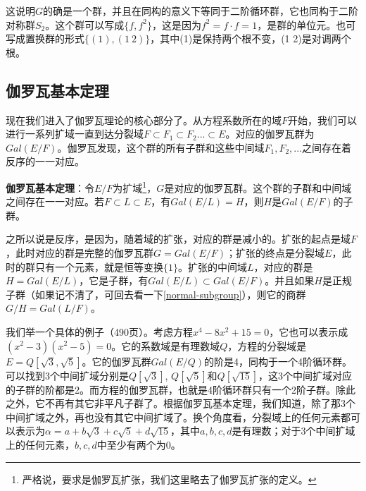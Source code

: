 \documentclass{article}
\begin{document}
这说明$G$的确是一个群，并且在同构的意义下等同于二阶循环群，它也同构于二阶对称群$S_2$。这个群可以写成$\{f, f^2\}$，这是因为$f^2 = f \cdot f = 1$，是群的单位元。也可写成置换群的形式$\{(1), (1\ 2)\}$，其中(1)是保持两个根不变，(1 2)是对调两个根。

\begin{Exercise}
\end{Exercise}

\subsection{伽罗瓦基本定理}

现在我们进入了伽罗瓦理论的核心部分了。从方程系数所在的域$F$开始，我们可以进行一系列扩域一直到达分裂域$F \subset F_1 \subset F_2 ... \subset E$。对应的伽罗瓦群为$Gal(E/F)$。伽罗瓦发现，这个群的所有子群和这些中间域$F_1, F_2, ...$之间存在着反序的一一对应。

\begin{theorem}
\textbf{伽罗瓦基本定理}：令$E/F$为扩域\footnote{严格说，要求是伽罗瓦扩张，我们这里略去了伽罗瓦扩张的定义。}，$G$是对应的伽罗瓦群。这个群的子群和中间域之间存在一一对应。若$F \subset L \subset E$，有$Gal(E/L) = H$，则$H$是$Gal(E/F)$的子群。
\end{theorem}

之所以说是反序，是因为，随着域的扩张，对应的群是减小的。扩张的起点是域$F$，此时对应的群是完整的伽罗瓦群$G = Gal(E/F)$；扩张的终点是分裂域$E$，此时的群只有一个元素，就是恒等变换$\{1\}$。扩张的中间域$L$，对应的群是$H = Gal(E/L)$，它是子群，有$Gal(E/L) \subset Gal(E/F)$。并且如果$H$是正规子群（如果记不清了，可回去看一下\ref{normal-subgroup}），则它的商群$G/H = Gal(L/F)$。

我们举一个具体的例子\cite{MArtin}（490页）。考虑方程$x^4 - 8x^2 + 15 = 0$，它也可以表示成$(x^2 - 3)(x^2 - 5) = 0$。它的系数域是有理数域$Q$，方程的分裂域是$E = Q[\sqrt{3}, \sqrt{5}]$。它的伽罗瓦群$Gal(E/Q)$的阶是4，同构于一个4阶循环群。可以找到3个中间扩域分别是$Q[\sqrt{3}]$, $Q[\sqrt{5}]$和$Q[\sqrt{15}]$，这3个中间扩域对应的子群的阶都是2。而方程的伽罗瓦群，也就是4阶循环群只有一个2阶子群。除此之外，它不再有其它非平凡子群了。根据伽罗瓦基本定理，我们知道，除了那3个中间扩域之外，再也没有其它中间扩域了。换个角度看，分裂域上的任何元素都可以表示为$\alpha = a + b\sqrt{3} + c\sqrt{5} + d\sqrt{15}$，其中$a, b, c, d$是有理数；对于3个中间扩域上的任何元素，$b, c, d$中至少有两个为0。
\end{document}
